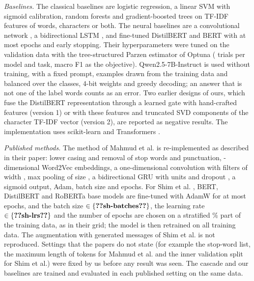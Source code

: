 \emph{Baselines.} The classical baselines are logistic regression, a linear SVM with sigmoid calibration, random forests \cite{breiman2001} and gradient-boosted trees \cite{chen2016} on TF-IDF features of words, characters or both. The neural baselines are a convolutional network \cite{kim2014}, a bidirectional LSTM \cite{hochreiter1997}, and fine-tuned DistilBERT and BERT \cite{devlin2019} with at most  epochs and early stopping. Their hyperparameters were tuned on the validation data with the tree-structured Parzen estimator of Optuna \cite{akiba2019} ( trials per model and task, macro F1 as the objective). Qwen2.5-7B-Instruct \cite{qwen2024} is used without training, with a fixed prompt,  examples drawn from the training data and balanced over the classes, 4-bit weights and greedy decoding; an answer that is not one of the label words counts as an error. Two earlier designs of ours, which fuse the DistilBERT representation through a learned gate with  hand-crafted features (version 1) or with these features and  truncated SVD components of the character TF-IDF vector (version 2), are reported as negative results. The implementation uses scikit-learn \cite{pedregosa2011} and Transformers \cite{wolf2020}.

\emph{Published methods.} The method of Mahmud et al. \cite{mahmud2024} is re-implemented as described in their paper: lower casing and removal of stop words and punctuation, -dimensional Word2Vec embeddings, a one-dimensional convolution with  filters of width , max pooling of size , a bidirectional GRU with  units and dropout , a sigmoid output, Adam, batch size  and  epochs. For Shim et al. \cite{shim2024}, BERT, DistilBERT and RoBERTa \cite{liu2019} base models are fine-tuned with AdamW for at most  epochs, and the batch size $\in\{\val{sh-batches}\}$, the learning rate $\in\{\val{sh-lrs}\}$ and the number of epochs are chosen on a stratified \% part of the training data, as in their grid; the model is then retrained on all training data. The augmentation with generated messages of Shim et al. is not reproduced. Settings that the papers do not state (for example the stop-word list, the maximum length of  tokens for Mahmud et al. and the inner validation split for Shim et al.) were fixed by us before any result was seen. The cascade and our baselines are trained and evaluated in each published setting on the same data.

